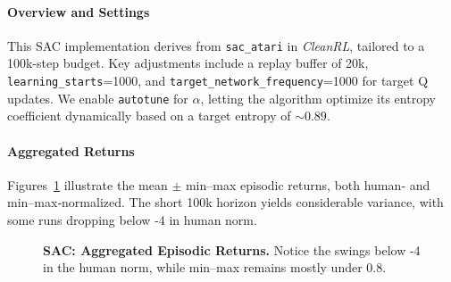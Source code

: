 \paragraph{Overview and Settings}
This SAC implementation derives from \texttt{sac\_atari} in \emph{CleanRL}, tailored to a 100k-step budget. Key adjustments include a replay buffer of 20k, \texttt{learning\_starts}=1000, and \texttt{target\_network\_frequency}=1000 for target Q updates. We enable \texttt{autotune} for \(\alpha\), letting the algorithm optimize its entropy coefficient dynamically based on a target entropy of \(\sim 0.89\).

\paragraph{Aggregated Returns}
Figures~\ref{fig:sac_returns_human_minmax} illustrate the mean $\pm$ min--max episodic returns, both human‐ and min--max‐normalized. The short 100k horizon yields considerable variance, with some runs dropping below -4 in human norm.

\begin{figure}[htbp]
	\centering
	\quad
	\caption{\textbf{SAC: Aggregated Episodic Returns.}
		Notice the swings below -4 in the human norm, while min--max remains mostly under 0.8.}
	\label{fig:sac_returns_human_minmax}
\end{figure}

